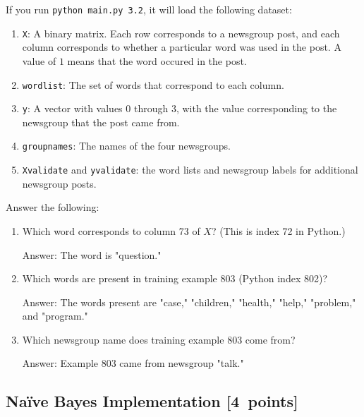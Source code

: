 \documentclass{article}
\newcommand{\blu}[1]{{\textcolor{blu}{#1}}}
\newenvironment{answer}{\par\begingroup\color{gre}Answer: }{\endgroup}
\let\ask\blu
\newcommand\pts[1]{\textcolor{pointscolour}{[#1~points]}}
\begin{document}
    If you run \texttt{python main.py 3.2}, it will load the following dataset:
    \begin{enumerate}
        \item \texttt{X}: A binary matrix. Each row corresponds to a newsgroup post, and each column corresponds to whether a particular word was used in the post. A value of $1$ means that the word occured in the post.
        \item \texttt{wordlist}: The set of words that correspond to each column.
        \item \texttt{y}: A vector with values $0$ through $3$, with the value corresponding to the newsgroup that the post came from.
        \item \texttt{groupnames}: The names of the four newsgroups.
        \item \texttt{Xvalidate} and \texttt{yvalidate}: the word lists and newsgroup labels for additional newsgroup posts.
    \end{enumerate}
    \ask{Answer the following}:
    \begin{enumerate}
        \item Which word corresponds to column 73 of $X$? (This is index 72 in Python.)
        
        \begin{answer}
            The word is "question."
        \end{answer}

        \item Which words are present in training example 803 (Python index 802)?
         
        \begin{answer}
            The words present are "case," "children," "health," "help," "problem," and "program."
        \end{answer}

        \item Which newsgroup name does training example 803 come from?
        
        \begin{answer}
            Example 803 came from newsgroup "talk."
        \end{answer}

    \end{enumerate}

    \clearpage
    \subsection{Na\"ive Bayes Implementation \pts{4}}
\end{document}
